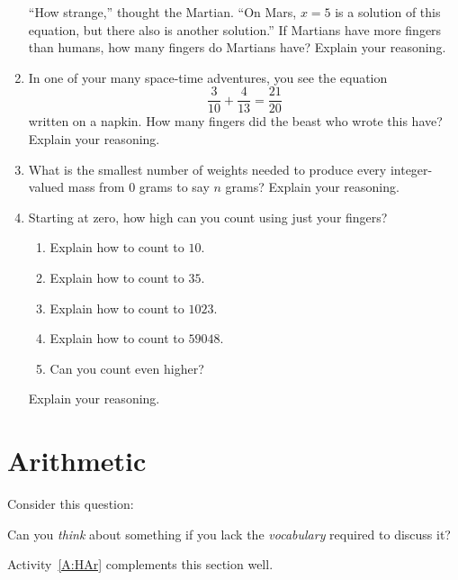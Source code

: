 \begin{problems}
\begin{enumerate}
``How strange,'' thought the Martian. ``On Mars, $x = 5$ is a solution
of this equation, but there also is another solution.'' If Martians
have more fingers than humans, how many fingers do Martians have?
Explain your reasoning.


\item In one of your many space-time adventures, you see the equation
\[
\frac{3}{10} + \frac{4}{13} = \frac{21}{20}
\]
written on a napkin. How many fingers did the beast who wrote this
have? Explain your reasoning.
\item What is the smallest number of weights needed to produce every
  integer-valued mass from $0$ grams to say $n$ grams? Explain your
  reasoning.
\item Starting at zero, how high can you count using just your
  fingers?
\begin{enumerate}
\item Explain how to count to $10$.
\item Explain how to count to $35$.
\item Explain how to count to $1023$.
\item Explain how to count to $59048$.
\item Can you count even higher?
\end{enumerate}
Explain your reasoning.
\end{enumerate}

\end{problems}








\section{Arithmetic}\label{S:aritmetic}


Consider this question:

\begin{question}
Can you \textit{think} about something if you lack the
\textit{vocabulary} required to discuss it?
\end{question}
\QM


\begin{activitynote}
Activity~\ref{A:HAr} complements this section well.  %
\end{activitynote}


